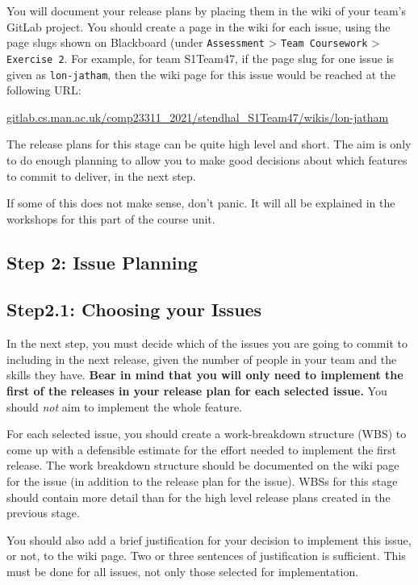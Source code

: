 \documentclass[
]{book}
\begin{document}
You will document your release plans by placing them in the wiki of your team's GitLab project. You should create a page in the wiki for each issue, using the page slugs shown on Blackboard (under \texttt{Assessment} \textgreater{} \texttt{Team\ Coursework} \textgreater{} \texttt{Exercise\ 2}. For example, for team S1Team47, if the page slug for one issue is given as \texttt{lon-jatham}, then the wiki page for this issue would be reached at the following URL:

\href{https://gitlab.cs.man.ac.uk/comp23311_2021/stendhal_S1Team47/wikis/lon-jatham}{gitlab.cs.man.ac.uk/comp23311\_2021/stendhal\_S1Team47/wikis/lon-jatham}

The release plans for this stage can be quite high level and short. The aim is only to do enough planning to allow you to make good decisions about which features to commit to deliver, in the next step.

If some of this does not make sense, don't panic. It will all be explained in the workshops for this part of the course unit.

\hypertarget{issueplan}{%
\subsection{Step 2: Issue Planning}\label{issueplan}}

\hypertarget{ischoose}{%
\subsection{Step2.1: Choosing your Issues}\label{ischoose}}

In the next step, you must decide which of the issues you are going to commit to including in the next release, given the number of people in your team and the skills they have. \textbf{Bear in mind that you will only need to implement the first of the releases in your release plan for each selected issue.} You should \emph{not} aim to implement the whole feature.

For each selected issue, you should create a work-breakdown structure (WBS) to come up with a defensible estimate for the effort needed to implement the first release. The work breakdown structure should be documented on the wiki page for the issue (in addition to the release plan for the issue). WBSs for this stage should contain more detail than for the high level release plans created in the previous stage.

You should also add a brief justification for your decision to implement this issue, or not, to the wiki page. Two or three sentences of justification is sufficient. This must be done for all issues, not only those selected for implementation.
\end{document}
